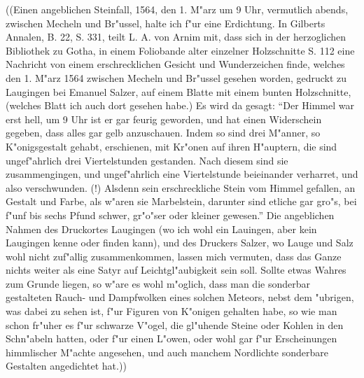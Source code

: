 \documentclass[a4paper, 11pt, oneside, polutonikogreek, german]{article}
\begin{document}
((Einen angeblichen Steinfall, 1564, den 1. M"arz um 9 Uhr, vermutlich abends, zwischen Mecheln und Br"ussel, halte ich f"ur eine Erdichtung. In Gilberts Annalen, B. 22, S. 331, teilt L. A. von Arnim mit, dass sich in der herzoglichen Bibliothek zu Gotha, in einem Foliobande alter einzelner Holzschnitte S. 112 eine Nachricht von einem erschrecklichen Gesicht und Wunderzeichen finde, welches den 1. M"arz 1564 zwischen Mecheln und Br"ussel gesehen worden, gedruckt zu Laugingen bei Emanuel Salzer, auf einem Blatte mit einem bunten Holzschnitte, (welches Blatt ich auch dort gesehen habe.) Es wird da gesagt: "`Der Himmel war erst hell, um 9 Uhr ist er gar feurig geworden, und hat einen Widerschein gegeben, dass alles gar gelb anzuschauen. Indem so sind drei M"anner, so K"onigsgestalt gehabt, erschienen, mit Kr"onen auf ihren H"auptern, die sind ungef"ahrlich drei Viertelstunden gestanden. Nach diesem sind sie zusammengingen, und ungef"ahrlich eine Viertelstunde beieinander verharret, und also verschwunden. (!) Alsdenn sein erschreckliche Stein vom Himmel gefallen, an Gestalt und Farbe, als w"aren sie Marbelstein, darunter sind etliche gar gro"s, bei f"unf bis sechs Pfund schwer, gr"o"ser oder kleiner gewesen."' Die angeblichen Nahmen des Druckortes Laugingen (wo ich wohl ein Lauingen, aber kein Laugingen kenne oder finden kann), und des Druckers Salzer, wo Lauge und Salz wohl nicht zuf"allig zusammenkommen, lassen mich vermuten, dass das Ganze nichts weiter als eine Satyr auf Leichtgl"aubigkeit sein soll. Sollte etwas Wahres zum Grunde liegen, so w"are es wohl m"oglich, dass man die sonderbar gestalteten Rauch- und Dampfwolken eines solchen Meteors, nebst dem "ubrigen, was dabei zu sehen ist, f"ur Figuren von K"onigen gehalten habe, so wie man schon fr"uher es f"ur schwarze V"ogel, die gl"uhende Steine oder Kohlen in den Schn"abeln hatten, oder f"ur einen L"owen, oder wohl gar f"ur Erscheinungen himmlischer M"achte angesehen, und auch manchem Nordlichte sonderbare Gestalten angedichtet hat.))
\end{document}

